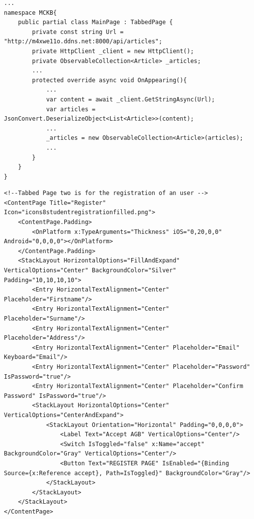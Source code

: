 	\begin{lstlisting}[caption={MCKB Code-behind - Webservice Call},label={lst:mckbcoderegweb},captionpos=b,style=csharp]
...
namespace MCKB{
    public partial class MainPage : TabbedPage {
        private const string Url = "http://m4xwe11o.ddns.net:8000/api/articles";
        private HttpClient _client = new HttpClient();
        private ObservableCollection<Article> _articles;
		...
        protected override async void OnAppearing(){
        	...
            var content = await _client.GetStringAsync(Url);
            var articles = JsonConvert.DeserializeObject<List<Article>>(content);
			...
            _articles = new ObservableCollection<Article>(articles);
            ...
        }
    }
}

	\end{lstlisting}

	\begin{lstlisting}[caption={MCKB XAML Code für Registrierung},label={lst:mckbcodereg},captionpos=b,style=XML-Own]
<!--Tabbed Page two is for the registration of an user -->
<ContentPage Title="Register" Icon="icons8studentregistrationfilled.png">
    <ContentPage.Padding>
        <OnPlatform x:TypeArguments="Thickness" iOS="0,20,0,0" Android="0,0,0,0"></OnPlatform>
    </ContentPage.Padding>
    <StackLayout HorizontalOptions="FillAndExpand" VerticalOptions="Center" BackgroundColor="Silver" Padding="10,10,10,10">
        <Entry HorizontalTextAlignment="Center" Placeholder="Firstname"/>
        <Entry HorizontalTextAlignment="Center" Placeholder="Surname"/>
        <Entry HorizontalTextAlignment="Center" Placeholder="Address"/>
        <Entry HorizontalTextAlignment="Center" Placeholder="Email" Keyboard="Email"/>
        <Entry HorizontalTextAlignment="Center" Placeholder="Password" IsPassword="true"/>
        <Entry HorizontalTextAlignment="Center" Placeholder="Confirm Password" IsPassword="true"/>
        <StackLayout HorizontalOptions="Center" VerticalOptions="CenterAndExpand">
            <StackLayout Orientation="Horizontal" Padding="0,0,0,0">
                <Label Text="Accept AGB" VerticalOptions="Center"/>
                <Switch IsToggled="false" x:Name="accept" BackgroundColor="Gray" VerticalOptions="Center"/>
                <Button Text="REGISTER PAGE" IsEnabled="{Binding Source={x:Reference accept}, Path=IsToggled}" BackgroundColor="Gray"/>
            </StackLayout>
        </StackLayout>
    </StackLayout>
</ContentPage>
	\end{lstlisting}

